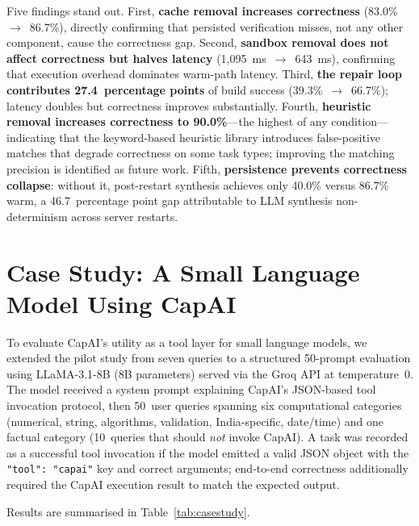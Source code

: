\documentclass[conference]{IEEEtran}
\begin{document}
Five findings stand out.
First, \textbf{cache removal increases correctness} (83.0\%~$\to$~86.7\%),
directly confirming that persisted verification misses, not any other
component, cause the correctness gap.
Second, \textbf{sandbox removal does not affect correctness but halves
latency} (1{,}095~ms~$\to$~643~ms), confirming that execution overhead
dominates warm-path latency.
Third, \textbf{the repair loop contributes 27.4~percentage points} of
build success (39.3\%~$\to$~66.7\%); latency doubles but correctness
improves substantially.
Fourth, \textbf{heuristic removal increases correctness to 90.0\%}---the
highest of any condition---indicating that the keyword-based heuristic
library introduces false-positive matches that degrade correctness on
some task types; improving the matching precision is identified as future
work.
Fifth, \textbf{persistence prevents correctness collapse}: without it,
post-restart synthesis achieves only 40.0\% versus 86.7\% warm,
a 46.7~percentage point gap attributable to LLM synthesis
non-determinism across server restarts.

\section{Case Study: A Small Language Model Using CapAI}
\label{sec:casestudy}

To evaluate CapAI's utility as a tool layer for small language models,
we extended the pilot study from seven queries to a structured 50-prompt
evaluation using LLaMA-3.1-8B (8B parameters) served via the Groq API
at temperature~0.
The model received a system prompt explaining CapAI's JSON-based tool
invocation protocol, then 50~user queries spanning six computational
categories (numerical, string, algorithms, validation, India-specific,
date/time) and one factual category (10~queries that should \emph{not}
invoke CapAI).
A task was recorded as a successful tool invocation if the model emitted
a valid JSON object with the \texttt{"tool": "capai"} key and correct
arguments; end-to-end correctness additionally required the CapAI
execution result to match the expected output.

Results are summarised in Table~\ref{tab:casestudy}.
\end{document}
